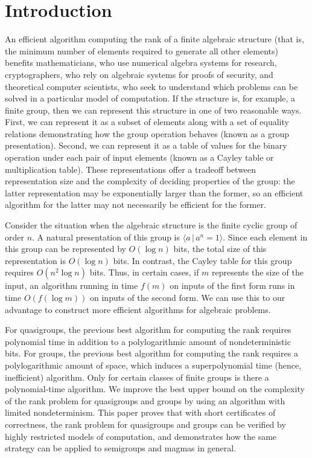 \section{Introduction}
%
An efficient algorithm computing the rank of a finite algebraic structure (that is, the minimum number of elements required to generate all other elements) benefits mathematicians, who use numerical algebra systems for research, cryptographers, who rely on algebraic systems for proofs of security, and theoretical computer scientists, who seek to understand which problems can be solved in a particular model of computation.
If the structure is, for example, a finite group, then we can represent this structure in one of two reasonable ways.
First, we can represent it as a subset of elements along with a set of equality relations demonstrating how the group operation behaves (known as a group presentation).
Second, we can represent it as a table of values for the binary operation under each pair of input elements (known as a Cayley table or multiplication table).
These representations offer a tradeoff between representation size and the complexity of deciding properties of the group: the latter representation may be exponentially larger than the former, so an efficient algorithm for the latter may not necessarily be efficient for the former.

Consider the situation when the algebraic structure is the finite cyclic group of order $n$.
A natural presentation of this group is $\langle a \, | \, a^n = 1 \rangle$.
Since each element in this group can be represented by $O(\log n)$ bits, the total size of this representation is $O(\log n)$ bits.
In contrast, the Cayley table for this group requires $O(n^2 \log n)$ bits.
Thus, in certain cases, if $m$ represents the size of the input, an algorithm running in time $f(m)$ on inputs of the first form runs in time $O(f(\log m))$ on inputs of the second form.
We can use this to our advantage to construct more efficient algorithms for algebraic problems.

%
For quasigroups, the previous best algorithm for computing the rank requires polynomial time in addition to a polylogarithmic amount of nondeterministic bits.
For groups, the previous best algorithm for computing the rank requires a polylogarithmic amount of space, which induces a superpolynomial time (hence, inefficient) algorithm.
Only for certain classes of finite groups is there a polynomial-time algorithm.
We improve the best upper bound on the complexity of the rank problem for quasigroups and groups by using an algorithm with limited nondeterminism.
This paper proves that with short certificates of correctness, the rank problem for quasigroups and groups can be verified by highly restricted models of computation, and demonstrates how the same strategy can be applied to semigroups and magmas in general.

